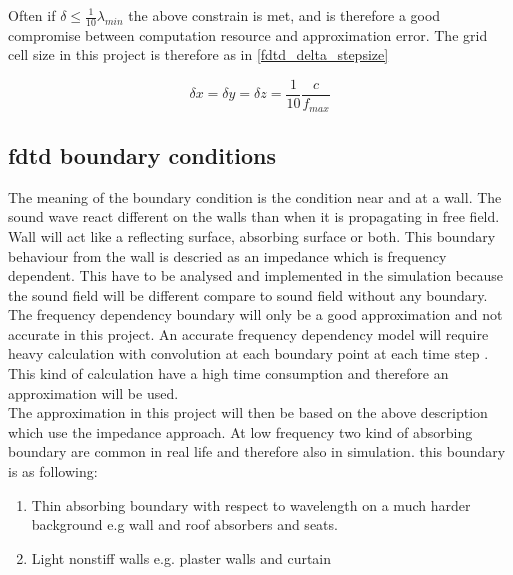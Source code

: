 Often if $ \delta \leq \frac{1}{10}\lambda_{min}$ the above constrain is met, and is therefore a good compromise between computation resource and approximation error. The grid cell size in this project is therefore as in \autoref{fdtd_delta_stepsize}

\begin{equation}\label{fdtd_delta_stepsize}
\delta x = \delta y = \delta z = \frac{1}{10} \frac{c}{f_{max}}
\end{equation}

    \startexplain
    \stopexplain
    
    
    
\subsection{\gls{fdtd} boundary conditions}        
The meaning of the boundary condition is the condition near and at a wall. The sound wave react different on the walls than when it is propagating in free field. Wall will act like a reflecting surface, absorbing surface or both. This boundary behaviour from the wall is descried as an impedance which is frequency dependent. This have to be analysed and implemented in the simulation because the sound field will be different compare to sound field without any boundary. The frequency dependency boundary will only be a good approximation and not accurate in this project. An accurate frequency dependency model will require heavy calculation with convolution at each boundary point at each time step \citep{finiteproblems}. This kind of calculation have a high time consumption and therefore an approximation will be used. \\
The approximation in this project will then be based on the above description which use the impedance approach. \citep{FDTDmodelling} At low frequency two kind of absorbing boundary are common in real life and therefore also in simulation. this boundary is as following:

\begin{enumerate}
\item Thin absorbing boundary with respect to wavelength on a much harder background e.g wall and roof absorbers and seats.
\item Light nonstiff walls e.g. plaster walls and curtain 
\end{enumerate}


